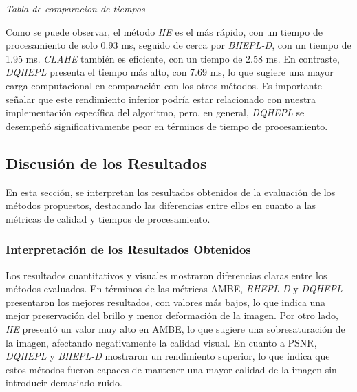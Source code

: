 \documentclass[sigchi]{acmart}
\begin{document}
\begin{table}[H]
	\caption{Comparación de tiempos de procesamiento}
	\label{tab:comparacion_tiempos}
	\small

	\vspace{0.5em}
	\footnotesize%
	\textit{Tabla de comparacion de tiempos}
\end{table}

Como se puede observar, el método \emph{HE} es el más rápido, con un tiempo de procesamiento
de solo 0.93 ms, seguido de cerca por \emph{BHEPL-D}, con un tiempo de 1.95 ms.
\emph{CLAHE} también es eficiente, con un tiempo de 2.58 ms. En contraste, \emph{DQHEPL}
presenta el tiempo más alto, con 7.69 ms, lo que sugiere una mayor carga computacional en
comparación con los otros métodos. Es importante señalar que este rendimiento inferior podría
estar relacionado con nuestra implementación específica del algoritmo, pero, en general,
\emph{DQHEPL} se desempeñó significativamente peor en términos de tiempo de procesamiento.


\subsection{Discusión de los Resultados} \label{subsec:discusion}

En esta sección, se interpretan los resultados obtenidos de la evaluación de los métodos
propuestos, destacando las diferencias entre ellos en cuanto a las métricas de calidad y
tiempos de procesamiento.

\subsubsection{Interpretación de los Resultados Obtenidos}

Los resultados cuantitativos y visuales mostraron diferencias claras entre los métodos
evaluados. En términos de las métricas AMBE, \emph{BHEPL-D} y \emph{DQHEPL} presentaron los
mejores resultados, con valores más bajos, lo que indica una mejor preservación del brillo y
menor deformación de la imagen. Por otro lado, \emph{HE} presentó un valor muy alto en AMBE,
lo que sugiere una sobresaturación de la imagen, afectando negativamente la calidad visual. En
cuanto a PSNR, \emph{DQHEPL} y \emph{BHEPL-D} mostraron un rendimiento superior, lo que
indica que estos métodos fueron capaces de mantener una mayor calidad de la imagen sin
introducir demasiado ruido.
\end{document}
